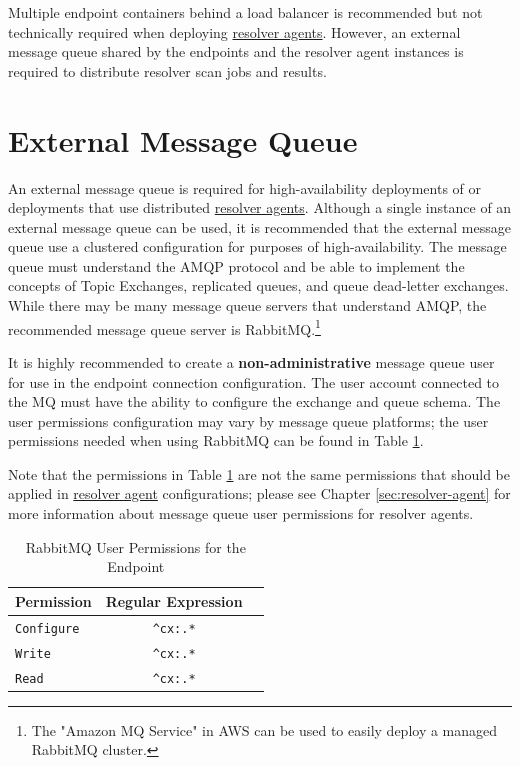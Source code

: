 Multiple \cxoneflow endpoint containers behind a load balancer is recommended but not technically required
when deploying \hyperref[sec:resolver-agent]{resolver agents}.  However, an external message queue shared by the \cxoneflow endpoints
and the resolver agent instances is required to distribute resolver scan jobs and results.  

\section{External Message Queue}

An external message queue is required for high-availability deployments of \cxoneflow or deployments that use distributed
\hyperref[sec:resolver-agent]{resolver agents}.  Although a single instance of an external message queue can be used, it is
recommended that the external message queue use a clustered configuration for purposes of high-availability.  The message queue
must understand the AMQP protocol and be able to implement the concepts of Topic Exchanges, replicated queues, and queue
dead-letter exchanges.  While there may be many message queue servers that understand AMQP, the recommended message queue
server is RabbitMQ.\footnote{The "Amazon MQ Service" in AWS can be used to easily deploy a managed RabbitMQ cluster.}

It is highly recommended to create a \textbf{non-administrative} message queue user for use in the \cxoneflow endpoint
connection configuration.  The user account connected to the MQ must have the ability to configure the
exchange and queue schema.  The user permissions configuration may vary by message queue platforms; the user permissions
needed when using RabbitMQ can be found in Table \ref{tab:server-mq-user-perms}.  

Note that the permissions in Table \ref{tab:server-mq-user-perms} are not the same permissions
that should be applied in \hyperref[sec:resolver-agent]{resolver agent} configurations; please see Chapter \ref{sec:resolver-agent} for more
information about message queue user permissions for resolver agents.

\begin{table}[ht]
    \caption{RabbitMQ User Permissions for the \cxoneflow Endpoint}  
    \label{tab:server-mq-user-perms}      
    \begin{tabularx}{\textwidth}{lcl}
        \toprule
        \textbf{Permission} & \textbf{Regular Expression} \\
        \midrule
        \texttt{Configure} & \texttt{\^{}cx:.*} \\
        \midrule
        \texttt{Write} & \texttt{\^{}cx:.*} \\
        \midrule
        \texttt{Read} & \texttt{\^{}cx:.*} \\
        \midrule
        \bottomrule
    \end{tabularx}
\end{table}



